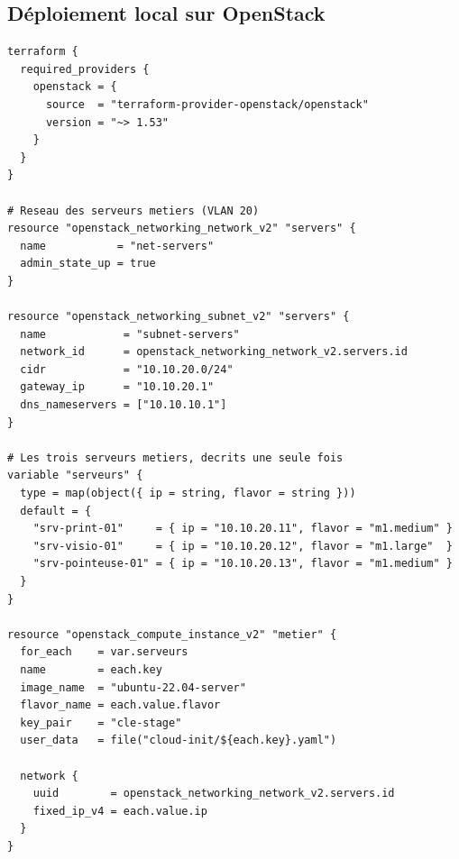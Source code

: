 \documentclass[11pt,a4paper]{article}
\begin{document}
\subsection{Déploiement local sur OpenStack}
\begin{lstlisting}[style=code]
terraform {
  required_providers {
    openstack = {
      source  = "terraform-provider-openstack/openstack"
      version = "~> 1.53"
    }
  }
}

# Reseau des serveurs metiers (VLAN 20)
resource "openstack_networking_network_v2" "servers" {
  name           = "net-servers"
  admin_state_up = true
}

resource "openstack_networking_subnet_v2" "servers" {
  name            = "subnet-servers"
  network_id      = openstack_networking_network_v2.servers.id
  cidr            = "10.10.20.0/24"
  gateway_ip      = "10.10.20.1"
  dns_nameservers = ["10.10.10.1"]
}

# Les trois serveurs metiers, decrits une seule fois
variable "serveurs" {
  type = map(object({ ip = string, flavor = string }))
  default = {
    "srv-print-01"     = { ip = "10.10.20.11", flavor = "m1.medium" }
    "srv-visio-01"     = { ip = "10.10.20.12", flavor = "m1.large"  }
    "srv-pointeuse-01" = { ip = "10.10.20.13", flavor = "m1.medium" }
  }
}

resource "openstack_compute_instance_v2" "metier" {
  for_each    = var.serveurs
  name        = each.key
  image_name  = "ubuntu-22.04-server"
  flavor_name = each.value.flavor
  key_pair    = "cle-stage"
  user_data   = file("cloud-init/${each.key}.yaml")

  network {
    uuid        = openstack_networking_network_v2.servers.id
    fixed_ip_v4 = each.value.ip
  }
}
\end{lstlisting}
\end{document}
